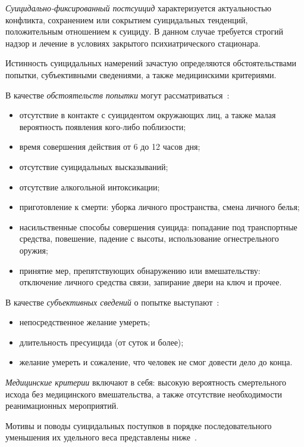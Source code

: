 \textit{Суицидально-фиксированный постсуицид} характеризуется актуальностью конфликта, сохранением или сокрытием суицидальных тенденций, положительным отношением к суициду. 
В данном случае требуется строгий надзор и лечение в условиях закрытого психиатрического стационара.~\cite{starsen}

Истинность суицидальных намерений зачастую определяются обстоятельствами попытки, субъективными сведениями, а также медицинскими критериями.~\cite{starsen}

В качестве \textit{обстоятельств попытки} могут рассматриваться~\cite{starsen}:

\begin{itemize}
	\item отсутствие в контакте с суицидентом окружающих лиц, а также малая вероятность появления кого-либо поблизости;
	\item время совершения действия от 6 до 12 часов дня;
	\item отсутствие суицидальных высказываний;
	\item отсутствие алкогольной интоксикации;
	\item приготовление к смерти: уборка личного пространства, смена личного белья;
	\item насильственные способы совершения суицида: попадание под транспортные средства, повешение, падение с высоты, использование огнестрельного оружия;
	\item принятие мер, препятствующих обнаружению или вмешательству: отключение личного средства связи, запирание двери на ключ и прочее.
\end{itemize}

В качестве \textit{субъективных сведений} о попытке выступают~\cite{starsen}:

\begin{itemize}
	\item непосредственное желание умереть;
	\item длительность пресуицида (от суток и более);
	\item желание умереть и сожаление, что человек не смог довести дело до конца.
\end{itemize}

\textit{Медицинские критерии} включают в себя: высокую вероятность смертельного исхода без медицинского вмешательства, а также отсутствие необходимости реанимационных мероприятий.~\cite{starsen}

Мотивы и поводы суицидальных поступков в порядке последовательного уменьшения их удельного веса представлены ниже~\cite{michlin}.

